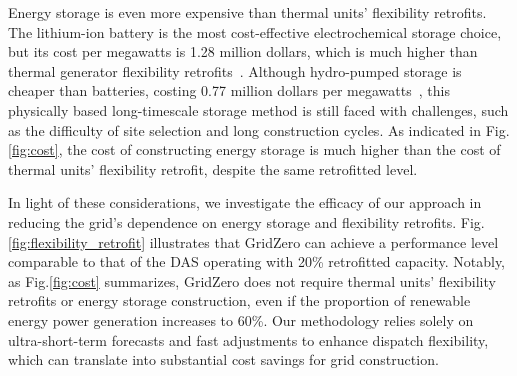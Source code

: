 Energy storage is even more expensive than thermal units' flexibility retrofits. The lithium-ion battery is the most cost-effective electrochemical storage choice, but its cost per megawatts is 1.28 million dollars, which is much higher than thermal generator flexibility retrofits~\cite{yan2022lcos}. Although hydro-pumped storage is cheaper than batteries, costing 0.77 million dollars per megawatts~\cite{sospiro2021cost}, 
this physically based long-timescale storage method is still faced with challenges, such as the difficulty of site selection and long construction cycles. As indicated in Fig.\ref{fig:cost}, the cost of constructing energy storage is much higher than the cost of thermal units' flexibility retrofit, despite the same retrofitted level.

In light of these considerations, we investigate the efficacy of our approach in reducing the grid's dependence on energy storage and flexibility retrofits. Fig.\ref{fig:flexibility_retrofit} illustrates that GridZero can achieve a performance level comparable to that of the DAS operating with 20\% retrofitted capacity.
Notably, as Fig.\ref{fig:cost} summarizes, GridZero does not require thermal units' flexibility retrofits or energy storage construction, even if the proportion of renewable energy power generation increases to 60\%. Our methodology relies solely on ultra-short-term forecasts and fast adjustments to enhance dispatch flexibility, which can translate into substantial cost savings for grid construction.
